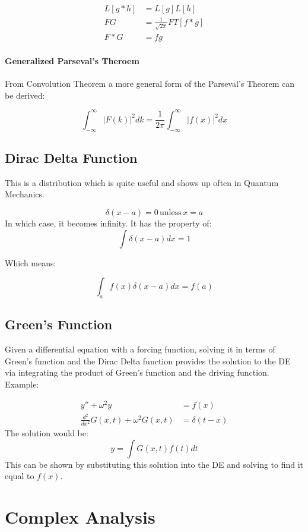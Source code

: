\documentclass[12pt]{article}
\begin{document}
\begin{align*}
    L[g*h] &= L[g]L[h]\\
    FG &= \frac{1}{\sqrt{2\pi}}FT[f*g]\\
    F*G &= fg
\end{align*}

\paragraph{Generalized Parseval's Theroem}
From Convolution Theorem a more general form of the Parseval's Theorem can be derived:

\[\int^\infty_{-\infty} |F(k)|^2 dk =\frac{1}{2\pi} \int^\infty_{-\infty}|f(x)|^2dx\]

\subsection{Dirac Delta Function}

This is a distribution which is quite useful and shows up often in Quantum Mechanics.

\[ \delta(x - a) = 0 \, \text{unless} \, x=a\]
In which case, it becomes infinity. It has the property of:
\[\int \delta(x-a) dx = 1\]

Which means:

\[ \int_a f(x)\delta(x-a)dx = f(a)\]

\subsection{Green's Function}
Given a differential equation with a forcing function, solving it in terms of Green's function and the Dirac Delta function provides the solution to the DE via integrating the product of Green's function and the driving function. Example:

\begin{align*}
    y''+\omega^2 y &= f(x) \\
    \frac{d^2}{dx^2}G(x,t) + \omega^2 G(x,t) &= \delta(t - x) 
\end{align*}
The solution would be:
\[y = \int G(x,t) f(t) dt\]
This can be shown by substituting this solution into the DE and solving to find it equal to $f(x)$. 





\section{Complex Analysis}
\end{document}
